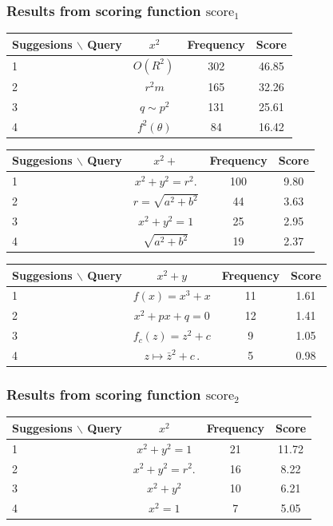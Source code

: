 \documentclass[12pt]{article} %
\begin{document}
\subsubsection{Results from scoring function $\text{score}_1$}
\begin{center}
\begin{tabular}{lccc}
Suggesions $\backslash$ Query  & $x^2 $ & Frequency & Score \\
\hline
 1 &  $ O(R^{2})\,\! $ & 302 & 46.85 \\
 2 &  $ r^{2}m $ & 165 & 32.26 \\
 3 &  $ q\sim p^{2} $ & 131 & 25.61 \\
 4 &  $ f^{2}(\theta) $ & 84 & 16.42 \\
\end{tabular}
\end{center}

\begin{center}
\begin{tabular}{lccc}
Suggesions $\backslash$ Query  & $x^2+ $ & Frequency & Score \\
\hline
 1 &  $ x^{2}+y^{2}=r^{2}.\! $ & 100 & 9.80 \\
 2 &  $ \scriptstyle r=\sqrt{a^{2}+b^{2}} $ & 44 & 3.63 \\
 3 &  $ x^{2}+y^{2}=1 $ & 25 & 2.95 \\
 4 &  $ \sqrt{a^{2}+b^{2}} $ & 19 & 2.37 \\
\end{tabular}
\end{center}

\begin{center}
\begin{tabular}{lccc}
Suggesions $\backslash$ Query  & $x^2 + y$ & Frequency & Score \\
\hline
 1 &  $ f(x)=x^{3}+x $ & 11 & 1.61 \\
 2 &  $ x^{2}+px+q=0 $ & 12 & 1.41 \\
 3 &  $ f_{c}(z)=z^{2}+c $ & 9 & 1.05 \\
 4 &  $ z\mapsto\bar{z}^{2}+c\,. $ & 5 & 0.98 \\
\end{tabular}
\end{center}

\subsubsection{Results from scoring function $\text{score}_2$}
\begin{center}
\begin{tabular}{lccc}
Suggesions $\backslash$ Query  & $x^2 $ & Frequency & Score \\
\hline
 1 &  $ x^{2}+y^{2}=1 $ & 21 & 11.72 \\
 2 &  $ x^{2}+y^{2}=r^{2}.\! $ & 16 & 8.22 \\
 3 &  $ x^{2}+y^{2} $ & 10 & 6.21 \\
 4 &  $ x^{2}=1 $ & 7 & 5.05 \\
\end{tabular}
\end{center}
\end{document}
